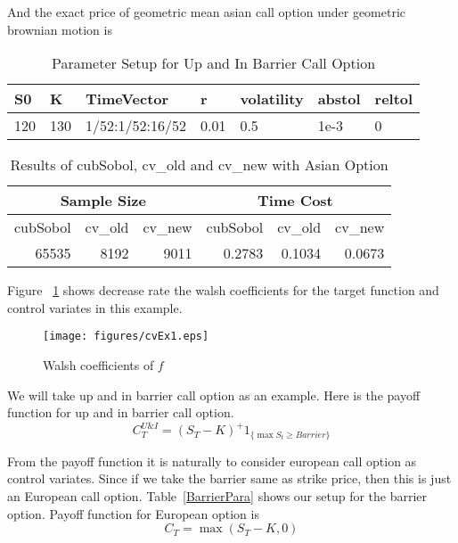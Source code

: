 And the exact price of geometric mean asian call option under geometric brownian motion is

\begin{table}[h]
    \centering
	\caption{Parameter Setup for Up and In Barrier Call Option}
	\begin{tabular}{lllllll}
		\hline\hline
        S0 & K & TimeVector & r & volatility & abstol & reltol \\[0.5ex]
        \hline
        120  & 130 & 1/52:1/52:16/52 & 0.01 & 0.5 & 1e-3 & 0\\[1ex] 
        \hline
	\end{tabular}
\end{table}

\begin{table}[h]
    \centering
	\caption{Results of cubSobol, cv\_old and cv\_new with Asian Option}
    \begin{tabular}{rrrrrr}  
    \hline\hline
	\multicolumn{3}{c}{Sample Size}
		&\multicolumn{3}{c}{Time Cost} \\
    \hline
	 cubSobol&cv\_old&cv\_new
    &cubSobol&cv\_old&cv\_new\\[0.5ex]
    \hline
		 65535&8192&9011
    &0.2783&0.1034&0.0673\\[1ex]
    \hline
	\end{tabular}
\end{table}

Figure ~\ref{fg:cvEX1} shows decrease rate the walsh coefficients for the target function and control variates in this example.

\begin{figure}[h]
    \centering
    \texttt{[image: figures/cvEx1.eps]}
    \label{fg:cvEX1}
    \caption{Walsh coefficients of $f$}
\end{figure}


We will take up and in barrier call option as an example. Here is the payoff function for up and in barrier call option.
\[ C_{T}^{U\&I} = (S_T-K)^+1_{ \{\max S_t \geq Barrier\}} \]

From the payoff function it is naturally to consider european call option as control variates. Since if we take the barrier same as strike price, then this is just an European call option. Table~\ref{BarrierPara} shows our setup for the barrier option.
Payoff function for European option is
\[ C_{T} = \max (S_T-K,0)\]

